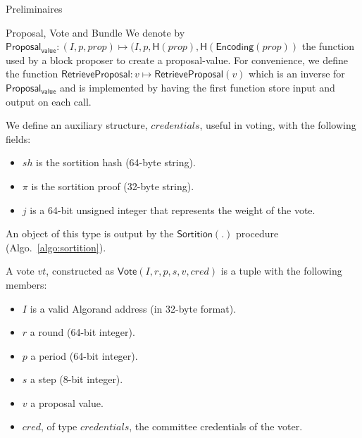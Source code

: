 \documentclass[10pt,a4paper]{article}
\begin{document}
\begin{section}{Preliminaires}
\begin{subsection}{Proposal, Vote and Bundle}
We denote by $\mathsf{Proposal_{value}}:(I, p, prop)\mapsto(I, p, \mathsf{H}(prop), \mathsf{H}(\mathsf{Encoding}(prop))$ 
the function used by a block proposer to create a proposal-value.
For convenience, we define the function $\mathsf{RetrieveProposal}:v\mapsto{\mathsf{RetrieveProposal}}(v)$ 
which is an inverse for $\mathsf{Proposal_{value}}$ and is implemented by having
the first function store input and output on each call.

We define an auxiliary structure, $credentials$, useful in voting, with the following fields:
\begin{itemize}
    \item $sh$ is the sortition hash (64-byte string).
    \item $\pi$ is the sortition proof (32-byte string).
    \item $j$ is a 64-bit unsigned integer that represents the weight of the vote.
\end{itemize}
An object of this type is output by the $\mathsf{Sortition}(.)$ procedure (Algo.~\ref{algo:sortition}).

A vote $vt$, constructed as $\mathsf{Vote}(I,r,p,s,v,cred)$ is a tuple with the following members:
\begin{itemize}
    \item $I$ is a valid Algorand address (in 32-byte format).
    \item $r$ a round (64-bit integer).
    \item $p$ a period (64-bit integer).
    \item $s$ a step (8-bit integer).
    \item $v$ a proposal value.
    \item $cred$, of type $credentials$, the committee credentials of the voter.
\end{itemize}



\end{subsection}
\end{section}
\end{document}
